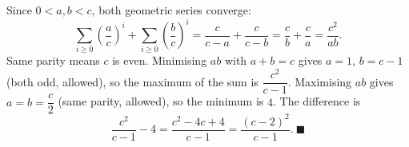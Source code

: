 Since $0<a,b<c$, both geometric series converge:
\[\sum_{i\ge0}\left(\dfrac ac\right)^i+\sum_{i\ge0}\left(\dfrac bc\right)^i=\dfrac c{c-a}+\dfrac c{c-b}=\dfrac cb+\dfrac ca=\dfrac{c^2}{ab}.\]
Same parity means $c$ is even. Minimising $ab$ with $a+b=c$ gives $a=1$, $b=c-1$ (both odd, allowed), so the maximum of the sum is $\dfrac{c^2}{c-1}$. Maximising $ab$ gives $a=b=\dfrac c2$ (same parity, allowed), so the minimum is $4$. The difference is
\[\dfrac{c^2}{c-1}-4=\dfrac{c^2-4c+4}{c-1}=\dfrac{(c-2)^2}{c-1}.\ \blacksquare\]
